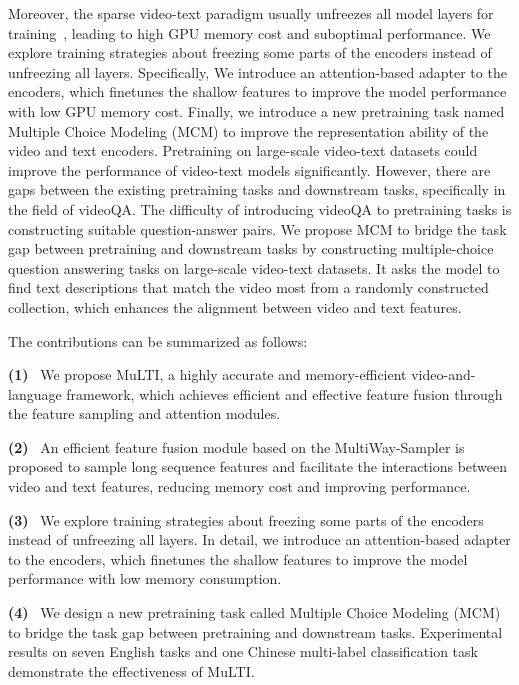 \documentclass[10pt,twocolumn,letterpaper]{article}
\begin{document}
Moreover, the sparse video-text paradigm usually unfreezes all model layers for training~\cite{Fu2021VIOLETE, Huang2022CloverTA,Lei2021Less,Li2021AlignAP,Lei2021UnderstandingCV}, leading to high GPU memory cost and suboptimal performance.
We explore training strategies about freezing some parts of the encoders instead of unfreezing all layers.
Specifically, We introduce an attention-based adapter to the encoders, which finetunes the shallow features to improve the model performance with low GPU memory cost. 
Finally, we introduce a new pretraining task named Multiple Choice Modeling (MCM) to improve the representation ability of the video and text encoders. Pretraining on large-scale video-text datasets could improve the performance of video-text models significantly.
However, there are gaps between the existing pretraining tasks and downstream tasks, specifically in the field of videoQA. The difficulty of introducing videoQA to pretraining tasks is constructing suitable question-answer pairs. We propose MCM to bridge the task gap between pretraining and downstream tasks by constructing multiple-choice question answering tasks on large-scale video-text datasets.
It asks the model to find text descriptions that match the video most from a randomly constructed collection, which enhances the alignment between video and text features.

The contributions can be summarized as follows:~

\textbf{(1)}~
We propose MuLTI, a highly accurate and memory-efficient video-and-language framework, which achieves efficient and effective feature fusion through the feature sampling and attention modules.

\textbf{(2)}~
An efficient feature fusion module based on the MultiWay-Sampler is proposed to sample long sequence features and facilitate the interactions between video and text features, reducing memory cost and improving performance.  

\textbf{(3)}~
We explore training strategies about freezing some parts of the encoders instead of unfreezing all layers. In detail, we introduce an attention-based adapter to the encoders, which finetunes the shallow features to improve the model performance with low memory consumption. 

\textbf{(4)}~
We design a new pretraining task called Multiple Choice Modeling (MCM) to bridge the task gap between pretraining and downstream tasks. Experimental results on seven English tasks and one Chinese multi-label classification task demonstrate the effectiveness of MuLTI.
 \vspace{-1.5ex}
\end{document}
